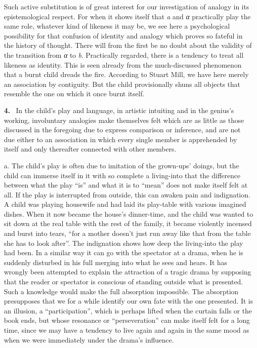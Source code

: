 \documentclass[12pt]{book}
\newcommand{\hnum}[1]{\noindent\textbf{#1.}~}
\newcommand{\opage}[1]{\marginnote{\footnotesize\textit{[#1]}}}
\begin{document}
Such active substitution is of great interest for our \opage{26}investigation of analogy
in its epistemological respect. For when it shows itself that \textit{a} and
\textit{α} practically play the same role, whatever kind of likeness it may be,
we see here a psychological possibility for that confusion of identity and
analogy which proves so fateful in the history of thought. There will from the
first be no doubt about the validity of the transition from \textit{α} to
\textit{b}. Practically regarded, there is a tendency to treat all likeness as
identity. This is seen already from the much-discussed phenomenon that a burnt
child dreads the fire. According to Stuart Mill, we have here merely an
association by contiguity. But the child provisionally shuns all objects that
resemble the one on which it once burnt itself.

\hnum{4} In the child's play and language, in artistic intuiting and in the
genius's working, involuntary analogies make themselves felt which are as little
as those discussed in the foregoing due to express comparison or inference, and
are not due either to an association in which every single member is apprehended
by itself and only thereafter connected with other members.

a. The child's play is often due to imitation of the grown-ups' doings, but the
child can immerse itself in it with so complete a living-into that the
difference between what the play ``is'' and what it is to ``mean'' does not make
itself felt at all. If the play is interrupted from outside, this can awaken
pain and indignation. A child was playing housewife and had laid its play-table
with various imagined dishes. When it now became the house's dinner-time, and
the child was wanted to sit down at the real table with the rest of the family,
it became violently incensed and burst into tears, ``for a mother doesn't just
run away like that from the table she has to look after''. The indignation shows
how deep the living-into the play had been. In a similar way it can go with the
spectator at a drama, \opage{27}when he is suddenly disturbed in his full merging into
what he sees and hears. It has wrongly been attempted to explain the attraction
of a tragic drama by supposing that the reader or spectator is conscious of
standing outside what is presented. Such a knowledge would make the full
absorption impossible. The absorption presupposes that we for a while identify
our own fate with the one presented. It is an illusion, a ``participation'',
which is perhaps lifted when the curtain falls or the book ends, but whose
resonance or ``perseveration'' can make itself felt for a long time, since we
may have a tendency to live again and again in the same mood as when we were
immediately under the drama's influence.
\end{document}
